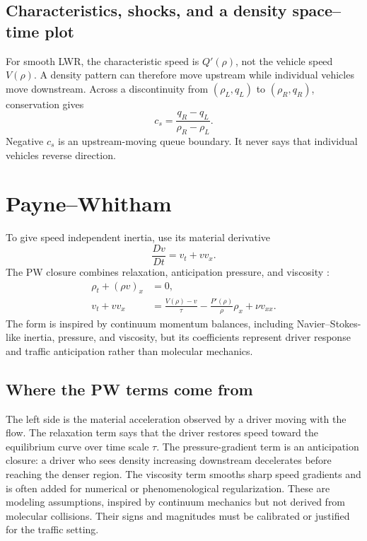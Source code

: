 \documentclass[11pt,a4paper,openany]{book}
\numberwithin{equation}{chapter}
\numberwithin{figure}{chapter}
\numberwithin{table}{chapter}
\begin{document}
\subsection{Characteristics, shocks, and a density space--time plot}
For smooth LWR, the characteristic speed is $Q'(\rho)$, not the vehicle speed $V(\rho)$. A density pattern can therefore move upstream while individual vehicles move downstream. Across a discontinuity from $(\rho_L,q_L)$ to $(\rho_R,q_R)$, conservation gives
\begin{equation}
c_s=\frac{q_R-q_L}{\rho_R-\rho_L}.
\end{equation}
Negative $c_s$ is an upstream-moving queue boundary. It never says that individual vehicles reverse direction.

\section{Payne--Whitham}
To give speed independent inertia, use its material derivative
\begin{equation}
\frac{Dv}{Dt}=v_t+vv_x.
\end{equation}
The PW closure combines relaxation, anticipation pressure, and viscosity \cite{payne1971}:
\begin{align}
\rho_t+(\rho v)_x&=0,\\
v_t+vv_x&=\frac{V(\rho)-v}{\tau}
-\frac{P'(\rho)}{\rho}\rho_x+\nu v_{xx}.
\end{align}
The form is inspired by continuum momentum balances, including Navier--Stokes-like inertia, pressure, and viscosity, but its coefficients represent driver response and traffic anticipation rather than molecular mechanics.

\subsection{Where the PW terms come from}
The left side is the material acceleration observed by a driver moving with the flow. The relaxation term says that the driver restores speed toward the equilibrium curve over time scale $\tau$. The pressure-gradient term is an anticipation closure: a driver who sees density increasing downstream decelerates before reaching the denser region. The viscosity term smooths sharp speed gradients and is often added for numerical or phenomenological regularization. These are modeling assumptions, inspired by continuum mechanics but not derived from molecular collisions. Their signs and magnitudes must be calibrated or justified for the traffic setting.
\end{document}
